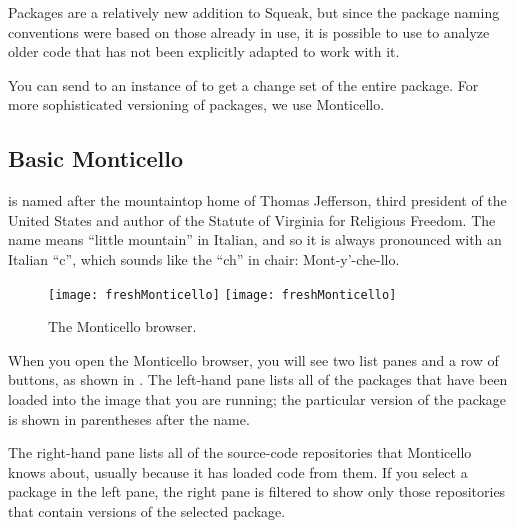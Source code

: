 \documentclass[a4paper,10pt,twoside]{book}
\begin{document}
Packages are a relatively new addition to Squeak, but since the package naming conventions were based on those already in use, it is possible to use  to analyze older code that has not been explicitly adapted to work with it.


You can send  to an instance of  to get a change set of the
entire package.  For more sophisticated versioning of packages, we use Monticello.

\subsection{Basic Monticello}

 is named after the mountaintop home of Thomas Jefferson, third president of the United States and author of the Statute of Virginia for Religious Freedom.  The name means ``little mountain'' in Italian, and so it is always pronounced with an Italian ``c'', which sounds like the ``ch'' in chair: Mont-y'-che-llo.


\begin{figure}[btp]
	\begin{center}
	\ifluluelse
		{\texttt{[image: freshMonticello]}}
		{\texttt{[image: freshMonticello]}}
	\end{center}
	\caption{The Monticello browser.}
	\label{fig:freshMonticello}
\end{figure}

When you open the Monticello browser, you will see two list panes and a row of buttons, as shown in .
The left-hand pane lists all of the packages that have been loaded into the image that you are running; the particular version of the package is shown in parentheses after the name.

The right-hand pane lists all of the source-code repositories that Monticello knows about, usually because it has loaded code from them.  If you select a package in the left pane, the right pane is filtered to show only those repositories that contain versions of the selected package.
\end{document}
